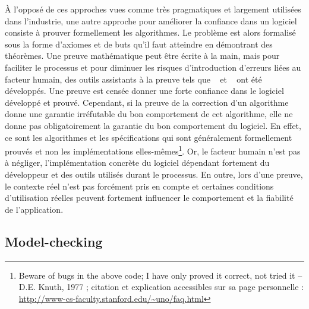 À l'opposé de ces approches vues comme très pragmatiques et largement utilisées
dans l'industrie, une autre approche pour améliorer la confiance dans un
logiciel consiste à prouver formellement les algorithmes. Le problème est alors
formalisé sous la forme d'axiomes et de buts qu'il faut atteindre en démontrant
des théorèmes. Une preuve mathématique peut être écrite à la main, mais pour
faciliter le processus et pour diminuer les risques d'introduction d'erreurs
liées au facteur humain, des outils assistants à la preuve tels que
{\coq}~\cite{Coq,Bertot2004} et {\isabelle}~\cite{Nipkow2002} ont été
développés. Une preuve {\coq} est censée donner une forte confiance dans le
logiciel développé et prouvé. Cependant, si la preuve de la correction d'un
algorithme donne une garantie irréfutable du bon comportement de cet
algorithme, elle ne donne pas obligatoirement la garantie du bon comportement
du logiciel. En effet, ce sont les algorithmes et les spécifications qui sont
généralement formellement prouvés et non les implémentations
elles-mêmes\footnote{\og Beware of bugs in the above code; I have only proved
  it correct, not tried it \fg{} -- D.E.  Knuth, 1977 ; citation et explication
  accessibles sur sa page personnelle :
  \url{http://www-cs-faculty.stanford.edu/~uno/faq.html}}. Or, le facteur
  humain n'est pas à négliger, l'implémentation concrète du logiciel dépendant
  fortement du développeur et des outils utilisés durant le processus. En
  outre, lors d'une preuve, le contexte réel n'est pas forcément pris en compte
  et certaines conditions d'utilisation réelles peuvent fortement influencer le
  comportement et la fiabilité de l'application. %



\subsection{Model-checking}
\label{ch:verification:subsec:mc}


